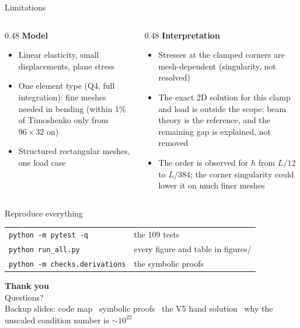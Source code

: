 \documentclass[aspectratio=169,10pt]{beamer}
\begin{document}
\begin{frame}{Limitations}
  \begin{columns}[T]
    \begin{column}{0.48\textwidth}
      \textbf{Model}
      \begin{itemize}
        \item Linear elasticity, small displacements, plane stress
        \item One element type (Q4, full integration): fine meshes needed in bending
              (within 1\% of Timoshenko only from $96\times32$ on)
        \item Structured rectangular meshes, one load case
      \end{itemize}
    \end{column}
    \begin{column}{0.48\textwidth}
      \textbf{Interpretation}
      \begin{itemize}
        \item Stresses at the clamped corners are mesh-dependent (singularity, not resolved)
        \item The exact 2D solution for this clamp and load is outside the scope: beam theory is the
              reference, and the remaining gap is explained, not removed
        \item The order is observed for $h$ from $L/12$ to $L/384$; the corner singularity could lower it on much
              finer meshes
      \end{itemize}
    \end{column}
  \end{columns}
  \vspace{0.3em}
  \begin{block}{Reproduce everything}
    \small
    \begin{tabular}{@{}ll@{}}
      \texttt{python -m pytest -q} & the 109 tests \\
      \texttt{python run\_all.py} & every figure and table in figures/ \\
      \texttt{python -m checks.derivations} & the symbolic proofs \\
    \end{tabular}
  \end{block}
\end{frame}

\begin{frame}[plain]
  \centering
  \vspace{2.5em}
  {\Large\bfseries Thank you}\\[1em]
  {\large Questions?}\\[2.5em]
  \small\color{ink2}
  Backup slides: code map \textbullet\ symbolic proofs \textbullet\ the V5 hand solution \textbullet\
  why the unscaled condition number is $\sim10^{22}$
\end{frame}
\end{document}
